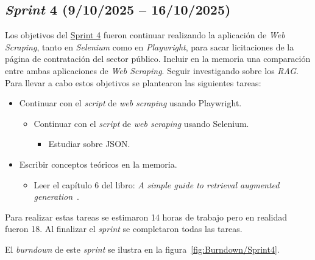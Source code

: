 \subsection{\textit{Sprint} 4 (9/10/2025 -- 16/10/2025)}
Los objetivos del \href{https://github.com/lbr1014/TFG_RAG/milestone/4?closed=1}{Sprint 4} fueron continuar realizando la aplicación de \textit{Web Scraping}, tanto en \textit{Selenium} como en \textit{Playwright}, para sacar licitaciones de la página de contratación del sector público. Incluir en la memoria una comparación entre ambas aplicaciones de \textit{Web Scraping}. Seguir investigando sobre los \textit{RAG}.
Para llevar a cabo estos objetivos se plantearon las siguientes tareas:
\begin{itemize}
\tightlist
	\item Continuar con el \textit{script} de \textit{web scraping} usando Playwright.
	\begin{itemize}
	\tightlist
		\item Continuar con el \textit{script} de \textit{web scraping} usando Selenium.
		\begin{itemize}
		\tightlist
			\item Estudiar sobre JSON.
		\end{itemize}
	\end{itemize}
	\item Escribir conceptos teóricos en la memoria.
	\begin{itemize}
	\tightlist
		\item Leer el capítulo 6 del libro: \textit{A simple guide to retrieval augmented generation}~\cite{book:RAG_SimpleGuide}.
	\end{itemize}
\end{itemize}

Para realizar estas tareas se estimaron 14 horas de trabajo pero en realidad fueron 18. Al finalizar el \textit{sprint} se completaron todas las tareas.

El \textit{burndown} de este \textit{sprint} se ilustra en la figura~\ref{fig:Burndown/Sprint4}.

